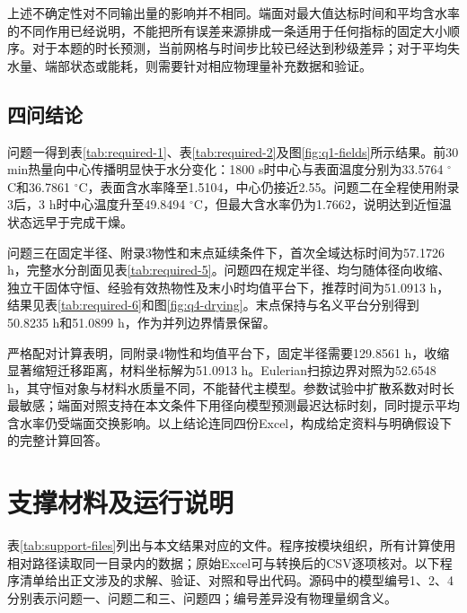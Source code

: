 上述不确定性对不同输出量的影响并不相同。端面对最大值达标时间和平均含水率的不同作用已经说明，不能把所有误差来源排成一条适用于任何指标的固定大小顺序。对于本题的时长预测，当前网格与时间步比较已经达到秒级差异；对于平均失水量、端部状态或能耗，则需要针对相应物理量补充数据和验证。

\subsection{四问结论}
问题一得到表\ref{tab:required-1}、表\ref{tab:required-2}及图\ref{fig:q1-fields}所示结果。前30 min热量向中心传播明显快于水分变化：1800 s时中心与表面温度分别为33.5764 $^\circ$C和36.7861 $^\circ$C，表面含水率降至1.5104，中心仍接近2.55。问题二在全程使用附录3后，3 h时中心温度升至49.8494 $^\circ$C，但最大含水率仍为1.7662，说明达到近恒温状态远早于完成干燥。

问题三在固定半径、附录3物性和末点延续条件下，首次全域达标时间为57.1726 h，完整水分剖面见表\ref{tab:required-5}。问题四在规定半径、均匀随体径向收缩、独立干固体守恒、经验有效热物性及末小时均值平台下，推荐时间为51.0913 h，结果见表\ref{tab:required-6}和图\ref{fig:q4-drying}。末点保持与名义平台分别得到50.8235 h和51.0899 h，作为并列边界情景保留。

严格配对计算表明，同附录4物性和均值平台下，固定半径需要129.8561 h，收缩显著缩短迁移距离，材料坐标解为51.0913 h。Eulerian扫掠边界对照为52.6548 h，其守恒对象与材料水质量不同，不能替代主模型。参数试验中扩散系数对时长最敏感；端面对照支持在本文条件下用径向模型预测最迟达标时刻，同时提示平均含水率仍受端面交换影响。以上结论连同四份Excel，构成给定资料与明确假设下的完整计算回答。

\clearpage
{}




\clearpage
\appendix
{}
\section{支撑材料及运行说明}\label{app:materials}
表\ref{tab:support-files}列出与本文结果对应的文件。程序按模块组织，所有计算使用相对路径读取同一目录内的数据；原始Excel可与转换后的CSV逐项核对。以下程序清单给出正文涉及的求解、验证、对照和导出代码。源码中的模型编号1、2、4分别表示问题一、问题二和三、问题四；编号差异没有物理量纲含义。

